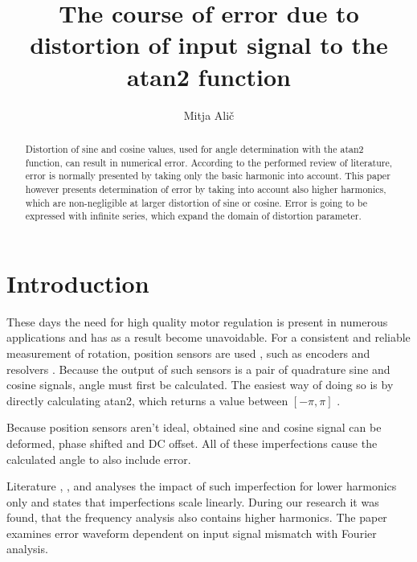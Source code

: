 \documentclass[a4paper]{article}
\begin{document}
\title{The course of error due to distortion of input signal to the atan2 function}

\author{Mitja Alič} %



\maketitle


\begin{abstract}{ }
Distortion of sine and cosine values, used for angle determination with the atan2 function, can result in numerical error. According to the performed review of literature, error is normally presented by taking only the basic harmonic into account. This paper however presents determination of error by taking into account also higher harmonics, which are non-negligible at larger distortion of sine or cosine. Error is going to be expressed with infinite series, which expand the domain of distortion parameter. 
\end{abstract}



\section{Introduction}


These days the need for high quality motor regulation is present in numerous applications and has as a result become unavoidable. For a consistent and reliable measurement of rotation, position sensors are used \cite{uporaba_senzorjev}, such as encoders and resolvers \cite{inkrementalni}\cite{resolver}\cite{enkoder}. Because the output of such sensors is a pair of quadrature sine and cosine signals, angle must first be calculated. The easiest way of doing so is by directly calculating atan2, which returns a value between $[-\pi, \pi]$ \cite{atan}.

Because position sensors aren’t ideal, obtained sine and cosine signal can be deformed, phase shifted and DC offset. All of these imperfections cause the calculated angle to also include error.

Literature  \cite{orbis}, \cite{RLS1}, \cite{RLS2} and \cite{RLS3} analyses the impact of such imperfection for lower harmonics only and states that imperfections scale linearly. During our research it was found, that the frequency analysis also contains higher harmonics. The paper examines error waveform dependent on input signal mismatch with Fourier analysis. 
\end{document}
